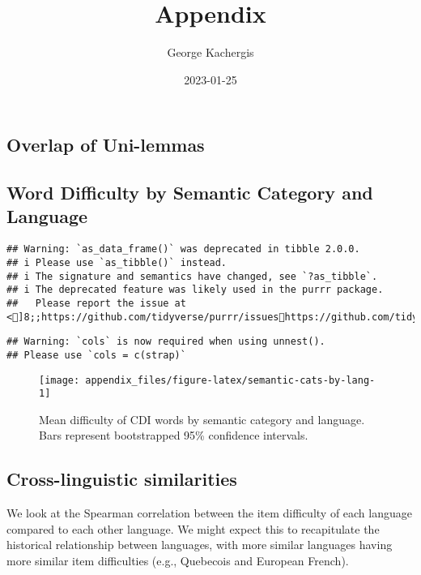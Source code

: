 \documentclass[
]{article}
\title{Appendix}
\author{George Kachergis}
\date{2023-01-25}
\begin{document}
\maketitle

\hypertarget{overlap-of-uni-lemmas}{%
\subsection{Overlap of Uni-lemmas}\label{overlap-of-uni-lemmas}}

\hypertarget{word-difficulty-by-semantic-category-and-language}{%
\subsection{Word Difficulty by Semantic Category and
Language}\label{word-difficulty-by-semantic-category-and-language}}

\begin{verbatim}
## Warning: `as_data_frame()` was deprecated in tibble 2.0.0.
## i Please use `as_tibble()` instead.
## i The signature and semantics have changed, see `?as_tibble`.
## i The deprecated feature was likely used in the purrr package.
##   Please report the issue at <]8;;https://github.com/tidyverse/purrr/issueshttps://github.com/tidyverse/purrr/issues]8;;>.
\end{verbatim}

\begin{verbatim}
## Warning: `cols` is now required when using unnest().
## Please use `cols = c(strap)`
\end{verbatim}

\begin{figure}

{\centering \texttt{[image: appendix\_files/figure-latex/semantic-cats-by-lang-1]} 

}

\caption{Mean difficulty of CDI words by semantic category and language. Bars represent bootstrapped 95\% confidence intervals.}\label{fig:semantic-cats-by-lang}
\end{figure}

\hypertarget{cross-linguistic-similarities}{%
\subsection{Cross-linguistic
similarities}\label{cross-linguistic-similarities}}

We look at the Spearman correlation between the item difficulty of each
language compared to each other language. We might expect this to
recapitulate the historical relationship between languages, with more
similar languages having more similar item difficulties (e.g., Quebecois
and European French).
\end{document}
